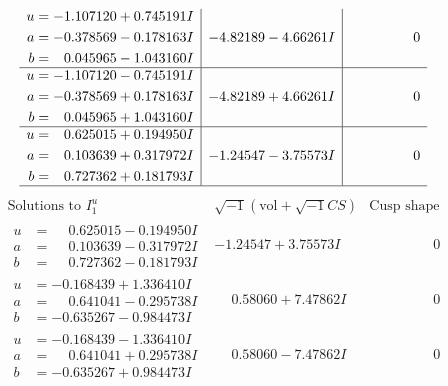 \documentclass[1p]{elsarticle_modified}
\theoremstyle{definition}
\newcommand{\I}{\sqrt{-1}}
\begin{document}
$$\begin{array}{c|c|c}
\begin{aligned}
u &= -1.107120 + 0.745191 I \\
a &= -0.378569 - 0.178163 I \\
b &= \phantom{-}0.045965 - 1.043160 I\end{aligned}
 & -4.82189 - 4.66261 I & \phantom{-0.000000 } 0 \\ \hline\begin{aligned}
u &= -1.107120 - 0.745191 I \\
a &= -0.378569 + 0.178163 I \\
b &= \phantom{-}0.045965 + 1.043160 I\end{aligned}
 & -4.82189 + 4.66261 I & \phantom{-0.000000 } 0 \\ \hline\begin{aligned}
u &= \phantom{-}0.625015 + 0.194950 I \\
a &= \phantom{-}0.103639 + 0.317972 I \\
b &= \phantom{-}0.727362 + 0.181793 I\end{aligned}
 & -1.24547 - 3.75573 I & \phantom{-0.000000 } 0\\
 \hline 
 \end{array}$$\newpage$$\begin{array}{c|c|c}  
\text{Solutions to }I^u_{1}& \I (\text{vol} + \sqrt{-1}CS) & \text{Cusp shape}\\
 \hline 
\begin{aligned}
u &= \phantom{-}0.625015 - 0.194950 I \\
a &= \phantom{-}0.103639 - 0.317972 I \\
b &= \phantom{-}0.727362 - 0.181793 I\end{aligned}
 & -1.24547 + 3.75573 I & \phantom{-0.000000 } 0 \\ \hline\begin{aligned}
u &= -0.168439 + 1.336410 I \\
a &= \phantom{-}0.641041 - 0.295738 I \\
b &= -0.635267 - 0.984473 I\end{aligned}
 & \phantom{-}0.58060 + 7.47862 I & \phantom{-0.000000 } 0 \\ \hline\begin{aligned}
u &= -0.168439 - 1.336410 I \\
a &= \phantom{-}0.641041 + 0.295738 I \\
b &= -0.635267 + 0.984473 I\end{aligned}
 & \phantom{-}0.58060 - 7.47862 I & \phantom{-0.000000 } 0 \\ \hline\begin{aligned}

\end{aligned}
\end{array}$$
\end{document}
